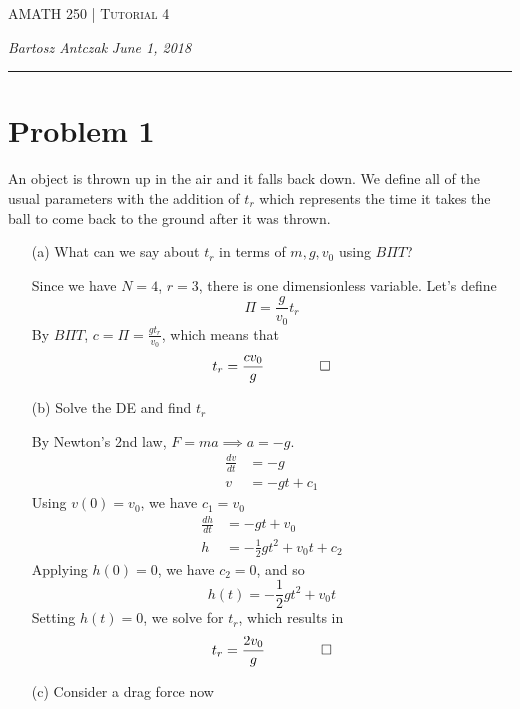 \documentclass{report}
\newcommand{\lectureNum}{4}
\newcommand{\curDate}{June 1, 2018}
\newcommand{\course}{AMATH 250}
\begin{document}
\begin{center}
\begin{Large}
\textsc{\course{} | Tutorial \lectureNum{}}
\end{Large}
\end{center} 
\noindent \textit{Bartosz Antczak} \hfill
\textit{\curDate{}}
\rule{\textwidth}{0.4pt}
\section*{Problem 1}
An object is thrown up in the air and it falls back down. We define all of the usual parameters with the addition of $t_r$ which represents the time it takes the ball to come back to the ground after it was thrown.
\begin{enumerate}
\item[(a)] What can we say about $t_r$ in terms of $m,g,v_0$ using $B\Pi T$?

\vspace{0.5em}\noindent
Since we have $N = 4$, $r=3$, there is one dimensionless variable. Let's define 
$$\Pi = \frac{g}{v_0}t_r$$
By $B\Pi T$, $c = \Pi = \frac{gt_r}{v_0}$, which means that
$$t_r = \frac{cv_0}{g} \qquad \qed$$
\item[(b)] Solve the DE and find $t_r$

\vspace{0.5em}\noindent
By Newton's 2nd law, $F = ma \implies a = -g$.
\begin{align*}
\frac{dv}{dt} &= -g \\
v &= -gt + c_1
\end{align*}
Using $v(0) = v_0$, we have $c_1 = v_0$
\begin{align*}
\frac{dh}{dt} &= -gt + v_0 \\
h &= -\frac{1}{2}gt^2 + v_0t + c_2
\end{align*}
Applying $h(0) = 0$, we have $c_2 = 0$, and so
$$h(t) = -\frac{1}{2}gt^2 + v_0t$$
Setting $h(t) = 0$, we solve for $t_r$, which results in
$$t_r = \frac{2v_0}{g} \qquad \qed$$
\item[(c)] Consider a drag force now


\end{enumerate}
\end{document}
